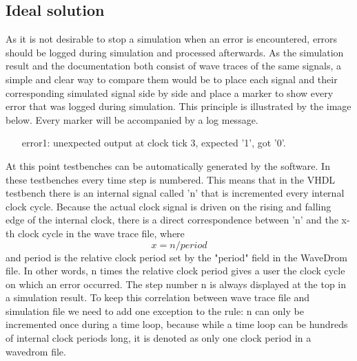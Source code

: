 \subsection{Ideal solution}\label{TD:ideal_solution}
As it is not desirable to stop a simulation when an error is encountered, errors should be logged during simulation and processed afterwards. As the simulation result and the documentation both consist of wave traces of the same signals, a simple and clear way to compare them would be to place each signal and their corresponding simulated signal side by side and place a marker to show every error that was logged during simulation. This principle is illustrated by the image below.
\newpage\noindent
Every marker will be accompanied by a log message.
\begin{customenv}
	\label{log:example}
	\begin{itemize}
		\centering
		\item [error1:] unexpected output at clock tick 3, expected '1', got '0'.
	\end{itemize}
\end{customenv}\nline
At this point testbenches can be automatically generated by the software. In these testbenches every time step is numbered. This means that in the VHDL testbench there is an internal signal called 'n' that is incremented every internal clock cycle. Because the actual clock signal is driven on the rising and falling edge of the internal clock, there is a direct correspondence between 'n' and the x-th clock cycle in the wave trace file, where
\begin{equation}
	x = n/period
\end{equation}
and period is the relative clock period set by the "period" field in the WaveDrom file. In other words, n times the relative clock period gives a user the clock cycle on which an error occurred. The step number n is always displayed at the top in a simulation result.
\npar
To keep this correlation between wave trace file and simulation file we need to add one exception to the rule: n can only be incremented once during a time loop, because while a time loop can be hundreds of internal clock periods long, it is denoted as only one clock period in a wavedrom file.

